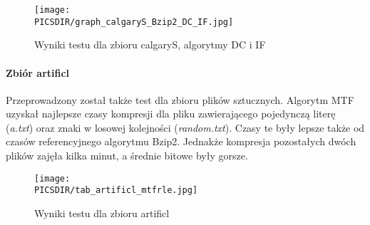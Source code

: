 \begin{figure}[phtb]
\texttt{[image: \\PICSDIR/graph\_calgaryS\_Bzip2\_DC\_IF.jpg]}
\caption{\label{fig:graph_calgaryS_Bzip2_DC_IF.jpgg}Wyniki testu dla zbioru calgaryS, algorytmy DC i IF}
\end{figure}

\paragraph{Zbiór artificl}

Przeprowadzony został także test dla zbioru plików sztucznych. Algorytm MTF uzyskał najlepsze czasy kompresji dla pliku zawierającego pojedynczą literę ({\em a.txt}) oraz znaki w losowej kolejności ({\em random.txt}). Czasy te były lepsze także od czasów referencyjnego algorytmu Bzip2. Jednakże kompresja pozostałych dwóch plików zajęła kilka minut, a  średnie bitowe były gorsze.

\begin{figure}[phtb]
\texttt{[image: \\PICSDIR/tab\_artificl\_mtfrle.jpg]}
\caption{\label{fig:tab_artificl_mtfrle.jpg}Wyniki testu dla zbioru artificl}
\end{figure}
